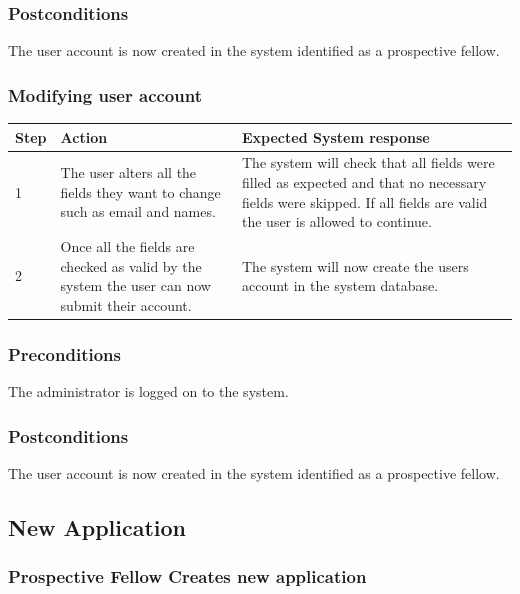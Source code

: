 \documentclass[12pt]{article}
\begin{document}
\subsubsection*{Postconditions}
The user account is now created in the system identified as a prospective fellow.

\subsubsection{Modifying user account}

\begin{center}
\begin{tabular}{|l|p{6cm}|p{8cm}|}
\hline
Step & Action & Expected System response \\
\hline
1 & The user alters all the fields they want to change such as email and names. & The system will check that all fields were filled as expected and that no necessary fields were skipped. If all fields are valid the user is allowed to continue. \\
\hline
2 & Once all the fields are checked as valid by the system the user can now submit their account. & The system will now create the users account in the system database. \\
\hline
\end{tabular}
\end{center}

\subsubsection*{Preconditions}
The administrator is logged on to the system.

\subsubsection*{Postconditions}
The user account is now created in the system identified as a prospective fellow.

\subsection{New Application}

\subsubsection{Prospective Fellow Creates new application}
\end{document}
